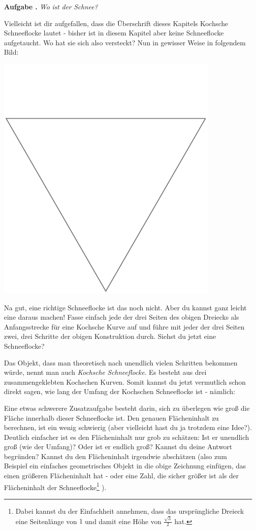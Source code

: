\documentclass[a4paper,ngerman,12pt]{scrartcl}
\theoremstyle{definition}
\theoremstyle{plain}
\theoremstyle{remark}
\newlength{\aufgabenskip}
\newcounter{aufgabennummer}
\newenvironment{aufgabe}[1]{
  \addtocounter{aufgabennummer}{1}
  \textbf{Aufgabe \theaufgabennummer.} \emph{#1} \par
}{\vspace{\aufgabenskip}}
\begin{document}
\begin{aufgabe}{Wo ist der Schnee?}
Vielleicht ist dir aufgefallen, dass die Überschrift dieses Kapitels \glqq Kochsche Schneeflocke\grqq{} lautet - bisher ist in diesem Kapitel aber keine Schneeflocke aufgetaucht. Wo hat sie sich also versteckt? Nun in gewisser Weise in folgendem Bild:
	\begin{center}
		\includegraphics[width=.6\textwidth]{Bilder/Eigene_Schneeflocke.pdf}
	\end{center}	
Na gut, eine richtige Schneeflocke ist das noch nicht. Aber du kannst ganz leicht eine daraus machen! Fasse einfach jede der drei Seiten des obigen Dreiecks als Anfangsstrecke für eine Kochsche Kurve auf und führe mit jeder der drei Seiten zwei, drei Schritte der obigen Konstruktion durch. Siehst du jetzt eine Schneeflocke?

Das Objekt, dass man theoretisch \glqq nach unendlich vielen Schritten\grqq{} bekommen würde, nennt man auch \emph{Kochsche Schneeflocke}. Es besteht aus drei zusammengeklebten Kochschen Kurven. Somit kannst du jetzt vermutlich schon direkt sagen, wie lang der Umfang der Kochschen Schneeflocke ist - nämlich: \underline{}

Eine etwas schwerere Zusatzaufgabe besteht darin, sich zu überlegen wie groß die Fläche innerhalb dieser Schneeflocke ist. Den genauen Flächeninhalt zu berechnen, ist ein wenig schwierig (aber vielleicht hast du ja trotzdem eine Idee?). Deutlich einfacher ist es den Flächeninhalt nur grob zu schätzen: Ist er unendlich groß (wie der Umfang)? Oder ist er endlich groß? Kannst du deine Antwort begründen? Kannst du den Flächeninhalt irgendwie abschätzen (also zum Beispiel ein einfaches geometrisches Objekt in die obige Zeichnung einfügen, das einen größeren Flächeninhalt hat - oder eine Zahl, die sicher größer ist als der Flächeninhalt der Schneeflocke\footnote{Dabei kannst du der Einfachheit annehmen, dass das ursprüngliche Dreieck eine Seitenlänge von $1$ und damit eine Höhe von $\frac{\sqrt{3}}{2}$ hat.} ).
\end{aufgabe}
\end{document}

